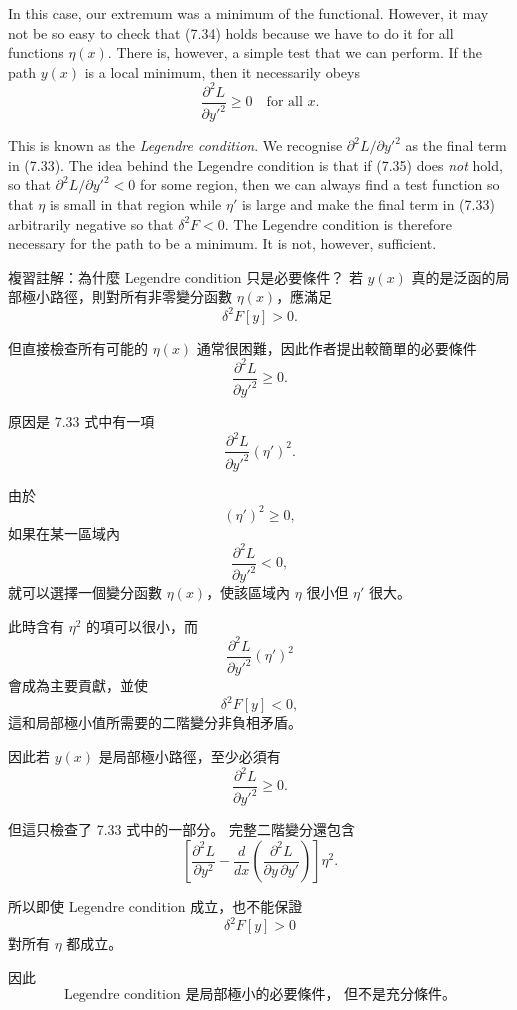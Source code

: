 \documentclass[11pt,a4paper,twoside]{article}
\newcommand{\pnum}[1]{\makebox[0pt][r]{\scriptsize\textbf{[#1]}\hspace{0.7em}}}
\newcommand{\StudyNote}[2]{\begin{studyNote}{#1}#2\end{studyNote}}
\begin{document}
\noindent\pnum{53}In this case, our extremum was a minimum of the functional. However, it may not be so easy to check that (7.34) holds because we have to do it for all functions $\eta(x)$. There is, however, a simple test that we can perform. If the path $y(x)$ is a local minimum, then it necessarily obeys
\begin{equation}
    \frac{\partial^2 L}{\partial y'^2}\geq0\quad\text{for all }x.
    \tag{7.35}
\end{equation}

\noindent\pnum{54}This is known as the \textit{Legendre condition}. We recognise $\partial^2 L/\partial y'^2$ as the final term in (7.33). The idea behind the Legendre condition is that if (7.35) does \textit{not} hold, so that $\partial^2 L/\partial y'^2<0$ for some region, then we can always find a test function so that $\eta$ is small in that region while $\eta'$ is large and make the final term in (7.33) arbitrarily negative so that $\delta^2 F<0$. The Legendre condition is therefore necessary for the path to be a minimum. It is not, however, sufficient.
\StudyNote{複習註解：為什麼 Legendre condition 只是必要條件？}{
若 $y(x)$ 真的是泛函的局部極小路徑，則對所有非零變分函數
$\eta(x)$，應滿足
\[
    \delta^2F[y]>0.
\]

但直接檢查所有可能的 $\eta(x)$ 通常很困難，因此作者提出較簡單的必要條件
\[
    \boxed{
        \frac{\partial^2L}{\partial y'^2}\ge0.
    }
\]

原因是 7.33 式中有一項
\[
    \frac{\partial^2L}{\partial y'^2}(\eta')^2.
\]

由於
\[
    (\eta')^2\ge0,
\]
如果在某一區域內
\[
    \frac{\partial^2L}{\partial y'^2}<0,
\]
就可以選擇一個變分函數 $\eta(x)$，使該區域內 $\eta$ 很小但
$\eta'$ 很大。

此時含有 $\eta^2$ 的項可以很小，而
\[
    \frac{\partial^2L}{\partial y'^2}(\eta')^2
\]
會成為主要貢獻，並使
\[
    \delta^2F[y]<0,
\]
這和局部極小值所需要的二階變分非負相矛盾。

因此若 $y(x)$ 是局部極小路徑，至少必須有
\[
    \frac{\partial^2L}{\partial y'^2}\ge0.
\]

但這只檢查了 7.33 式中的一部分。
完整二階變分還包含
\[
    \left[
        \frac{\partial^2L}{\partial y^2}
        -
        \frac{d}{dx}
        \left(
        \frac{\partial^2L}{\partial y\,\partial y'}
        \right)
        \right]\eta^2.
\]

所以即使 Legendre condition 成立，也不能保證
\[
    \delta^2F[y]>0
\]
對所有 $\eta$ 都成立。

因此
\[
    \boxed{
        \text{Legendre condition 是局部極小的必要條件，
            但不是充分條件。}
    }
\]
}
\end{document}
